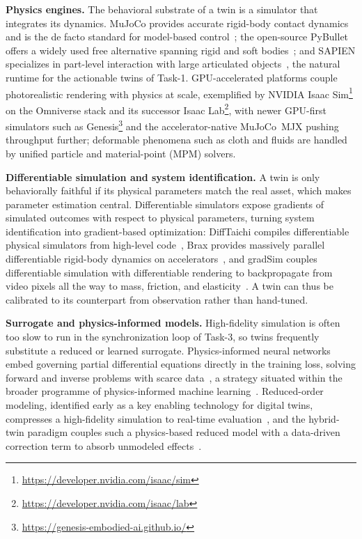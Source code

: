 \textbf{Physics engines.} The behavioral substrate of a twin is a simulator that integrates its dynamics.
MuJoCo provides accurate rigid-body contact dynamics and is the de facto standard for model-based control~\cite{todorov2012mujoco}; the open-source PyBullet offers a widely used free alternative spanning rigid and soft bodies~\cite{coumans2021}; and SAPIEN specializes in part-level interaction with large articulated objects~\cite{xiang2020sapien}, the natural runtime for the actionable twins of Task-1.
GPU-accelerated platforms couple photorealistic rendering with physics at scale, exemplified by NVIDIA Isaac Sim\footnote{\url{https://developer.nvidia.com/isaac/sim}} on the Omniverse stack and its successor Isaac Lab\footnote{\url{https://developer.nvidia.com/isaac/lab}}, with newer GPU-first simulators such as Genesis\footnote{\url{https://genesis-embodied-ai.github.io/}} and the accelerator-native MuJoCo~MJX pushing throughput further; deformable phenomena such as cloth and fluids are handled by unified particle and material-point (MPM) solvers.

\textbf{Differentiable simulation and system identification.} A twin is only behaviorally faithful if its physical parameters match the real asset, which makes parameter estimation central.
Differentiable simulators expose gradients of simulated outcomes with respect to physical parameters, turning system identification into gradient-based optimization: DiffTaichi compiles differentiable physical simulators from high-level code~\cite{hu2020difftaichi}, Brax provides massively parallel differentiable rigid-body dynamics on accelerators~\cite{freeman2021brax}, and gradSim couples differentiable simulation with differentiable rendering to backpropagate from video pixels all the way to mass, friction, and elasticity~\cite{jatavallabhula2021gradsim}. A twin can thus be calibrated to its counterpart from observation rather than hand-tuned.

\textbf{Surrogate and physics-informed models.} High-fidelity simulation is often too slow to run in the synchronization loop of Task-3, so twins frequently substitute a reduced or learned surrogate.
Physics-informed neural networks embed governing partial differential equations directly in the training loss, solving forward and inverse problems with scarce data~\cite{raissi2019physics}, a strategy situated within the broader programme of physics-informed machine learning~\cite{karniadakis2021physics}.
Reduced-order modeling, identified early as a key enabling technology for digital twins, compresses a high-fidelity simulation to real-time evaluation~\cite{hartmann2018model}, and the hybrid-twin paradigm couples such a physics-based reduced model with a data-driven correction term to absorb unmodeled effects~\cite{chinesta2020virtual}.

